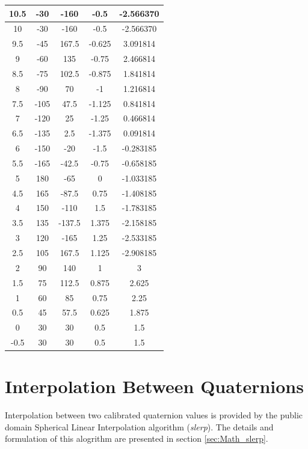 \documentclass[11pt,fleqn]{report}
\begin{document}
\begin{longtable}{|c|c|c|c|c|}
10.5&     -30&    -160&    -0.5&  -2.566370\\ \hline
  10&     -30&    -160&    -0.5&  -2.566370\\ \hline
 9.5&     -45&   167.5&  -0.625&   3.091814\\ \hline
   9&     -60&     135&   -0.75&   2.466814\\ \hline
 8.5&     -75&   102.5&  -0.875&   1.841814\\ \hline
   8&     -90&      70&      -1&   1.216814\\ \hline
 7.5&    -105&    47.5&  -1.125&   0.841814 \\ \hline
   7&    -120&      25&   -1.25&   0.466814 \\ \hline
 6.5&    -135&     2.5&  -1.375&   0.091814 \\ \hline
   6&    -150&     -20&    -1.5&  -0.283185 \\ \hline
 5.5&    -165&   -42.5&   -0.75&  -0.658185 \\ \hline
   5&     180&     -65&       0&  -1.033185\\ \hline
 4.5&     165&   -87.5&    0.75&  -1.408185\\ \hline
   4&     150&    -110&     1.5&  -1.783185\\ \hline
 3.5&     135&  -137.5&   1.375&  -2.158185\\ \hline
   3&     120&    -165&    1.25&  -2.533185\\ \hline
 2.5&     105&   167.5&   1.125&  -2.908185\\ \hline
   2&      90&     140&       1&       3 \\ \hline
 1.5&      75&   112.5&   0.875&   2.625 \\ \hline
   1&      60&      85&    0.75&    2.25 \\ \hline
 0.5&      45&    57.5&   0.625&   1.875 \\ \hline
   0&      30&      30&     0.5&     1.5 \\ \hline
-0.5&      30&      30&     0.5&     1.5 \\ \hline

\end{longtable}

\clearpage

\section {Interpolation Between Quaternions}
Interpolation between two calibrated quaternion values is provided by the
public domain Spherical Linear Interpolation algorithm (\textit{slerp}).
The details
and formulation of this alogrithm are presented in section \ref{sec:Math_slerp}.
\end{document}
